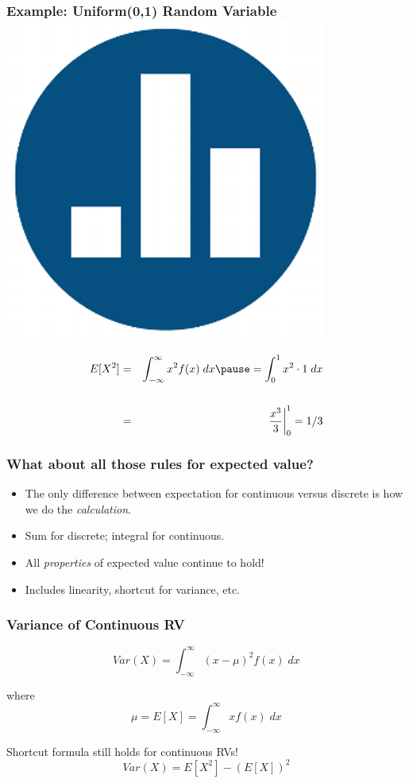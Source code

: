 \documentclass[handout]{beamer}
\begin{document}
\begin{frame}
\frametitle{Example: Uniform(0,1) Random Variable \hfill \includegraphics[scale = 0.05]{./images/clicker}}
	\begin{eqnarray*}
	E[X^2] &=& \int_{-\infty}^\infty x^2 f(x) \; dx \pause = \int_0^1 x^2 \cdot 1 \; dx\\ \\
		&=& \left. \frac{x^3}{3}\right|_0^1 = 1/3
	\end{eqnarray*}
\end{frame}


\begin{frame}
\frametitle{What about all those rules for expected value?}
\begin{itemize}
  \item The only difference between expectation for continuous versus discrete is how we do the \emph{calculation}.
  \item Sum for discrete; integral for continuous.
  \item All \emph{properties} of expected value \alert{continue to hold!}
  \item Includes linearity, shortcut for variance, etc.
\end{itemize}
\end{frame}

\begin{frame}
\frametitle{Variance of Continuous RV}

$$\boxed{Var(X) = \int_{-\infty}^{\infty} (x - \mu)^2 f(x) \; dx}$$

\vspace{2em}
where
$$\mu = E[X]=\int_{-\infty}^\infty x f(x) \; dx $$

\vspace{2em}
\alert{Shortcut formula still holds for continuous RVs!}
	$$Var(X) = E[X^2] - \left(E[X]\right)^2$$
\end{frame}
\end{document}

